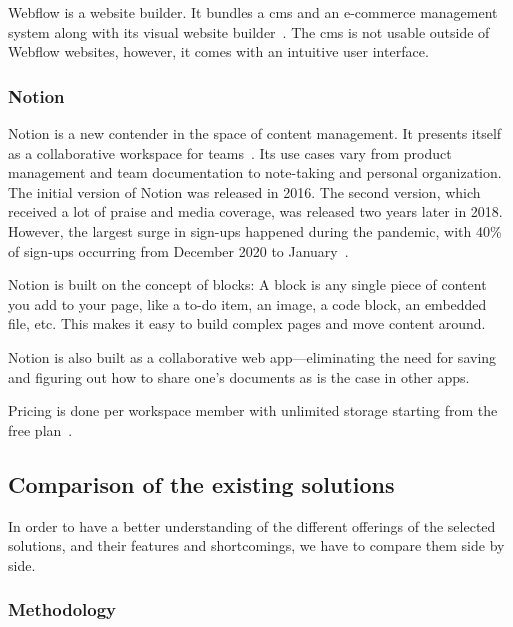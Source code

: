 
Webflow is a website builder.
It bundles a \acrshort{cms} and an e-commerce management system along with its visual website builder~\autocite{noauthor_web_nodate}.
The \acrshort{cms} is not usable outside of Webflow websites, however, it comes with an intuitive user interface.

\subsubsection{Notion}


Notion is a new contender in the space of content management.
It presents itself as a collaborative workspace for teams~\autocite{noauthor_notion_nodate}.
Its use cases vary from product management and team documentation to note-taking and personal organization.
The initial version of Notion was released in 2016.
The second version, which received a lot of praise and media coverage, was released two years later in 2018.
However, the largest surge in sign-ups happened during the pandemic, with 40\% of sign-ups occurring from December 2020 to January~\autocite{noauthor_focus_nodate}.

Notion is built on the concept of blocks: A block is any single piece
of content you add to your page, like a to-do item, an image, a code
block, an embedded file, etc.
This makes it easy to build complex pages and move content around.

Notion is also built as a collaborative web app---eliminating the need
for saving and figuring out how to share one's documents as is the case in other apps.

Pricing is done per workspace member with unlimited storage starting
from the free plan~\autocite{noauthor_notion_nodate}.

\subsection{Comparison of the existing solutions}

In order to have a better understanding of the different offerings of the selected solutions, and their features and shortcomings, we have to compare them side by side.

\subsubsection{Methodology}

